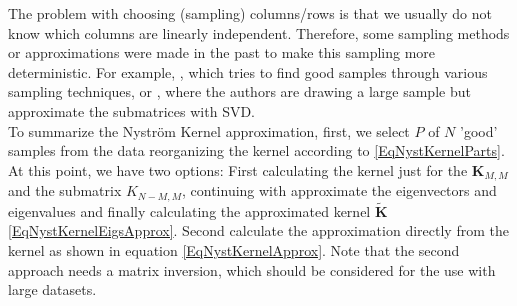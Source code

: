 The problem with choosing (sampling) columns/rows is that we usually do not know which columns are linearly independent.
Therefore, some sampling methods or approximations were made in the past to make this sampling more deterministic.
For example, \cite{Kumar.2012}, which tries to find good samples through various sampling techniques, or \cite{Li.2015}, where the authors are drawing a large sample but approximate the submatrices with \ac{SVD}.\\
To summarize the Nyström Kernel approximation, first, we select $P$ of $N$ 'good' samples from the data reorganizing the kernel according to \eqref{EqNystKernelParts}.
At this point, we have two options:
First calculating the kernel just for the $\mathbf{K}_{M, M}$ and the submatrix ${K}_{N-M, M}$, continuing with approximate the eigenvectors and eigenvalues and finally calculating the approximated kernel $\tilde{\mathbf{K}}$ \eqref{EqNystKernelEigsApprox}.
Second calculate the approximation directly from the kernel as shown in equation \eqref{EqNystKernelApprox}. Note that the second approach needs a matrix inversion, which should be considered for the use with large datasets.

